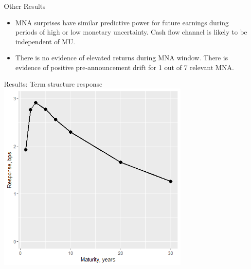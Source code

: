 \documentclass{beamer}
\begin{document}
\begin{frame}{Other Results}
    \begin{itemize}
        \item {MNA surprises have similar predictive power for future earnings during periods of high or low monetary uncertainty. Cash flow channel is likely to be independent of MU.}
        \item {There is no evidence of elevated returns during MNA window. There is evidence of positive pre-announcement drift for 1 out of 7 relevant MNA.}
    \end{itemize}
\end{frame}



\begin{frame}{Results: Term structure response}
\centering
\includegraphics[width=0.72\textwidth]{old_files/F2_termstructure_0.png}
\end{frame}
\end{document}
